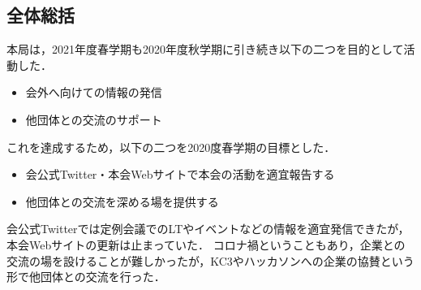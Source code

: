 \subsection*{全体総括}


本局は，2021年度春学期も2020年度秋学期に引き続き以下の二つを目的として活動した．
\begin{itemize}
	\item 会外へ向けての情報の発信
	\item 他団体との交流のサポート
\end{itemize}
これを達成するため，以下の二つを2020度春学期の目標とした．
\begin{itemize}
	\item 会公式Twitter・本会Webサイトで本会の活動を適宜報告する
	\item 他団体との交流を深める場を提供する
\end{itemize}

会公式Twitterでは定例会議でのLTやイベントなどの情報を適宜発信できたが，
本会Webサイトの更新は止まっていた．
コロナ禍ということもあり，企業との交流の場を設けることが難しかったが，KC3やハッカソンへの企業の協賛という形で他団体との交流を行った．